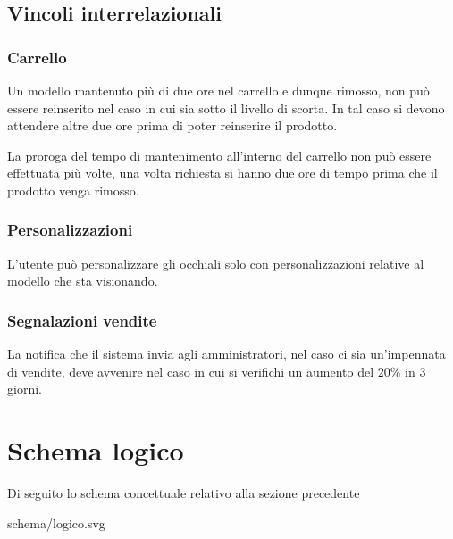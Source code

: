 \documentclass[12pt, a4paper]{article}
\begin{document}
\subsection{Vincoli interrelazionali}
\subsubsection{Carrello}
Un modello mantenuto più di due ore nel carrello e dunque rimosso, non può essere reinserito nel
caso in cui sia sotto il livello di scorta. In tal caso si devono attendere altre due ore prima di
poter reinserire il prodotto.

La proroga del tempo di mantenimento all'interno del carrello non può essere effettuata più volte,
una volta richiesta si hanno due ore di tempo prima che il prodotto venga rimosso.

\subsubsection{Personalizzazioni}
L'utente può personalizzare gli occhiali solo con personalizzazioni relative al modello che sta
visionando.

\subsubsection{Segnalazioni vendite}
La notifica che il sistema invia agli amministratori, nel caso ci sia un'impennata di vendite,
deve avvenire nel caso in cui si verifichi un aumento del 20\% in 3 giorni.

\section{Schema logico}
Di seguito lo schema concettuale relativo alla sezione precedente

 {schema/logico.svg}
\end{document}
